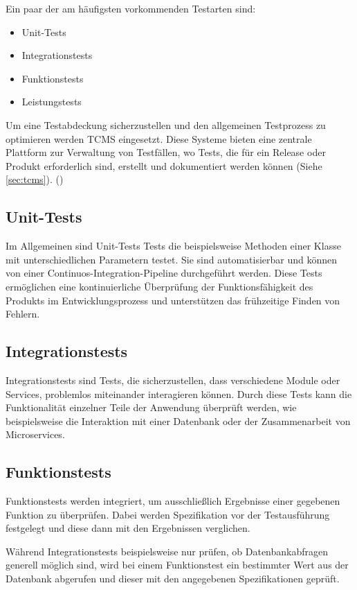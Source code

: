 \documentclass[a4paper, fontsize=11pt, parskip=half, twoside]{scrreprt}
\begin{document}
	Ein paar der am häufigsten vorkommenden Testarten sind:
	
	\begin{itemize}
		\item Unit-Tests
		\item Integrationstests
		\item Funktionstests
		\item Leistungstests
	\end{itemize}

	Um eine Testabdeckung sicherzustellen und den allgemeinen Testprozess zu optimieren werden \ac{TCMS} eingesetzt. 
	Diese Systeme bieten eine zentrale Plattform zur Verwaltung von Testfällen, wo Tests, die für ein Release oder Produkt erforderlich sind, erstellt und dokumentiert werden können (Siehe \autoref{sec:tcms}). (\textcite{ammann_introduction_2016})
	
	\subsection{Unit-Tests}
	Im Allgemeinen sind Unit-Tests Tests die beispielsweise Methoden einer Klasse mit unterschiedlichen Parametern testet. 
	Sie sind automatisierbar und können von einer Continuos-Integration-Pipeline durchgeführt werden. 
	Diese Tests ermöglichen eine kontinuierliche Überprüfung der Funktionsfähigkeit des Produkts im Entwicklungsprozess und unterstützen das frühzeitige Finden von Fehlern.
	
	\subsection{Integrationstests}
	Integrationstests sind Tests, die sicherzustellen, dass verschiedene Module oder Services, problemlos miteinander interagieren können. 
	Durch diese Tests kann die Funktionalität einzelner Teile der Anwendung überprüft werden, wie beispielsweise die Interaktion mit einer Datenbank oder der Zusammenarbeit von Microservices.
	
	\subsection{Funktionstests}
	Funktionstests werden integriert, um ausschließlich Ergebnisse einer gegebenen Funktion zu überprüfen. Dabei werden Spezifikation vor der Testausführung festgelegt und diese dann mit den Ergebnissen verglichen.
	
	Während Integrationstests beispielsweise nur prüfen, ob Datenbankabfragen generell möglich sind, wird bei einem Funktionstest ein bestimmter Wert aus der Datenbank abgerufen und dieser mit den angegebenen Spezifikationen geprüft.
	
\end{document}
